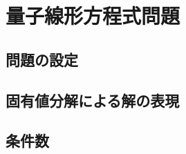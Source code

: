\section{量子線形方程式問題}
\label{sec:quantum-linear-system-problem}

\subsection{問題の設定}
\label{subsec:qlsp-formulation}

\subsection{固有値分解による解の表現}
\label{subsec:eigendecomposition-of-solution}

\subsection{条件数}
\label{subsec:condition-number}

